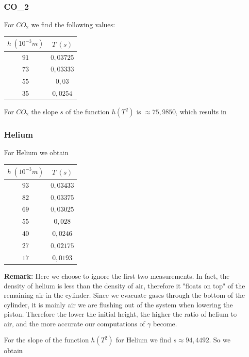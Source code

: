 \documentclass{scrartcl}
\begin{document}
\subsubsection{CO_2}
For $CO_2$ we find the following values:

\medskip
\centering
\begin{tabular}{|c|c|}
    \hline
     $h  \ (10^{-3}m) $& $T  \ (s)$  \\
     \hline
     $91$ & $0,03725$ \\
     \hline
     $73$ & $0,03333$ \\
     \hline
     $55$ & $0,03$ \\
     \hline
     $35$ & $0,0254$ \\
     \hline
\end{tabular}
\flushleft
For $CO_2$ the slope $s$ of the function $h(T^2)$ is $\approx75,9850$, which results in 

\subsubsection{Helium}
For Helium we obtain 

\medskip
\centering
\begin{tabular}{|c|c|}
    \hline
     $h  \ (10^{-3}m) $& $T  \ (s)$  \\
     \hline
     $93$ & $0,03433$ \\
     \hline
     $82$ & $0,03375$ \\
     \hline
     $69$ & $0,03025$ \\
     \hline
     $55$ & $0,028$ \\
     \hline
     $40$ & $0,0246$ \\
     \hline
     $27$ & $0,02175$ \\
     \hline
     $17$ & $0,0193$ \\
     \hline
\end{tabular}
\flushleft
\textbf{Remark:} Here we choose to ignore the first two measurements. In fact, the density of helium is less than the density of air, therefore it "floats on top" of the remaining air in the cylinder. Since we evacuate gases through the bottom of the cylinder, it is mainly air we are flushing out of the system when lowering the piston. Therefore the lower the initial height, the higher the ratio of helium to air, and the more accurate our computations of $\gamma$ become.

For the slope of the function $h(T^2)$ for Helium we find $s\approx94,4492$. So we obtain 
\end{document}
